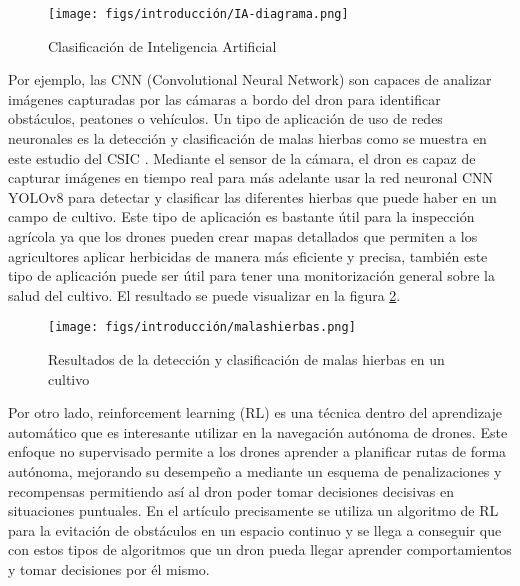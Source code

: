 \begin{figure} [H]
  \begin{center}
    \texttt{[image: figs/introducción/IA-diagrama.png]}
  \end{center}
  \caption{Clasificación de Inteligencia Artificial \cite{IA}}
  \label{fig:ClasificaciónIA}
  \vspace{-1.5em}
\end{figure}

Por ejemplo, las CNN (Convolutional Neural Network) son capaces de analizar imágenes capturadas por las cámaras a bordo del dron para identificar obstáculos, 
peatones o vehículos. Un tipo de aplicación de uso de redes neuronales es la detección y clasificación de malas hierbas como se muestra en este estudio del CSIC \cite{CSIC}. Mediante el sensor de la cámara, el dron es capaz de capturar imágenes en tiempo real 
para más adelante usar la red neuronal CNN YOLOv8 \cite{Ultralytics_YOLOv8} para detectar y clasificar las diferentes hierbas que puede haber en un campo de cultivo. Este tipo de aplicación 
es bastante útil para la inspección
agrícola ya que los drones pueden crear mapas detallados que permiten a los agricultores aplicar herbicidas de manera más eficiente y precisa, también este tipo de aplicación puede
ser útil para tener una monitorización general sobre la salud del cultivo. El resultado se puede visualizar en la figura \ref{fig:malas hierbas}. 

\begin{figure} [H]
  \begin{center}
    \texttt{[image: figs/introducción/malashierbas.png]}
  \end{center}
  \caption{Resultados de la detección y clasificación de malas hierbas en un cultivo \cite{CSIC}}
  \label{fig:malas hierbas}
  \vspace{-1.5em}
\end{figure}

Por otro lado, reinforcement learning (RL) \cite{6025669} es una técnica dentro del aprendizaje automático que es interesante utilizar en la navegación autónoma de drones. Este enfoque no supervisado
 permite
a los drones aprender a planificar rutas de forma autónoma, mejorando su desempeño a mediante un esquema de penalizaciones y recompensas permitiendo
así al dron poder tomar decisiones decisivas en situaciones puntuales. En el artículo \cite{ai2030023} precisamente se utiliza un algoritmo de RL para la evitación de obstáculos en un espacio continuo y se llega a conseguir que con estos
tipos de algoritmos que un dron pueda llegar aprender comportamientos y tomar decisiones por él mismo. 

